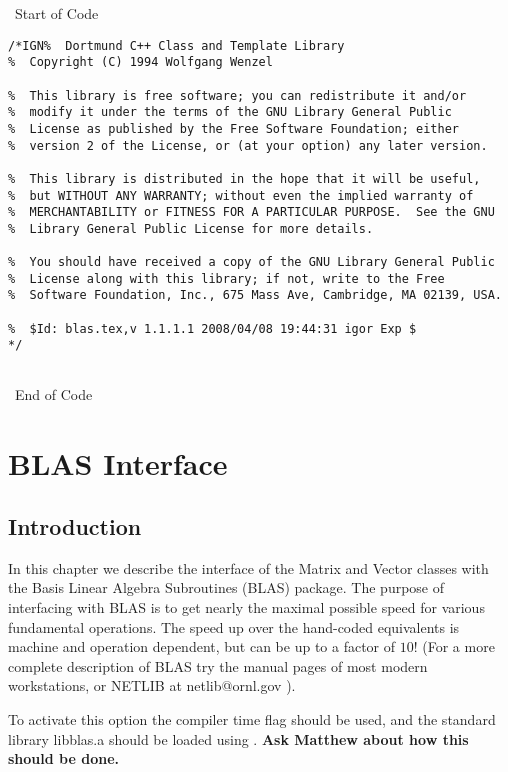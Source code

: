 \newpage 
{}

\vspace{0.1em} \small 
{\ \hrulefill Start of Code \hrulefill} 
\begin{verbatim} 
/*IGN%  Dortmund C++ Class and Template Library 
%  Copyright (C) 1994 Wolfgang Wenzel

%  This library is free software; you can redistribute it and/or
%  modify it under the terms of the GNU Library General Public
%  License as published by the Free Software Foundation; either
%  version 2 of the License, or (at your option) any later version.

%  This library is distributed in the hope that it will be useful,
%  but WITHOUT ANY WARRANTY; without even the implied warranty of
%  MERCHANTABILITY or FITNESS FOR A PARTICULAR PURPOSE.  See the GNU
%  Library General Public License for more details.

%  You should have received a copy of the GNU Library General Public
%  License along with this library; if not, write to the Free
%  Software Foundation, Inc., 675 Mass Ave, Cambridge, MA 02139, USA.
  
%  $Id: blas.tex,v 1.1.1.1 2008/04/08 19:44:31 igor Exp $
*/


\end{verbatim} 
{\ \hrulefill End of Code \hrulefill} \ \normalsize
 
\chapter{BLAS Interface}

\section{Introduction}

In this chapter we describe the interface of the Matrix and Vector
classes with the Basis Linear Algebra Subroutines (BLAS) package.  The
purpose of interfacing with BLAS is to get nearly the maximal possible
speed for various fundamental operations.  The speed up over the
hand-coded equivalents is machine and operation dependent, but can be
up to a factor of $10$!  (For a more complete description of BLAS try
the manual pages of most modern workstations, or NETLIB at
netlib@ornl.gov ).

To activate this option the compiler time flag  should be
used, and the standard library libblas.a should be loaded using
.  {\bf Ask Matthew about how this should be done.}

